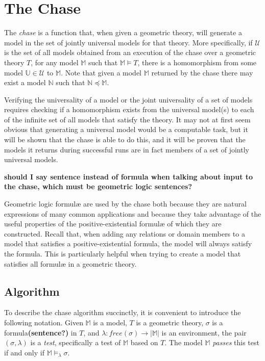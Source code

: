 \section{The Chase}
\label{sec:chase}

	The \emph{chase} is a function that, when given a geometric theory, will
	generate a model in the set of jointly universal models for that theory. More
	specifically, if $\mathcal{U}$ is the set of all models obtained from an
	execution of the chase over a geometric theory $T$, for any model
	$\mathbb{M}$ such that $\mathbb{M} \models T$, there is a homomorphism from
	some model $\mathbb{U} \in \mathcal{U}$ to $\mathbb{M}$. Note that given a
	model $\mathbb{M}$ returned by the chase there may exist a model
	$\mathbb{N}$ such that $\mathbb{N} \preceq \mathbb{M}$.

	Verifying the universality of a model or the joint universality of a set of
	models requires checking if a homomorphism exists from the universal model(s)
	to each of the infinite set of all models that satisfy the theory. It may
	not at first seem obvious that generating a universal model would be a
	computable task, but it will be shown that the chase is able to do this,
	and it will be proven that the models it returns during successful runs are
	in fact members of a set of jointly universal models.

	\textbf{should I say sentence instead of formula when talking about input
	to the chase, which must be geometric logic sentences?}

	Geometric logic formul{\ae} are used by the chase both because they are
	natural expressions of many common applications and because they take
	advantage of the useful properties of the positive-existential formul{\ae}
	of which they are constructed. Recall that, when adding any relations or
	domain members to a model that satisfies a positive-existential formula,
	the model will always satisfy the formula. This is particularly helpful
	when trying to create a model that satisfies all formul{\ae} in a geometric
	theory.

	\subsection{Algorithm}
	\label{sec:chase.algorithm}

		To describe the chase algorithm succinctly, it is convenient to
		introduce the following notation. Given $\mathbb{M}$ is a model, $T$ is
		a geometric theory, $\sigma$ is a formula\textbf{(sentence?)} in $T$,
		and $\lambda : free(\sigma) \to |\mathbb{M}|$ is an environment, the
		pair $(\sigma,\lambda)$ is a \emph{test}, specifically a test of
		$\mathbb{M}$ based on $T$. The model $\mathbb{M}$ \emph{passes} this
		test if and only if $\mathbb{M} \models_\lambda \sigma$.

